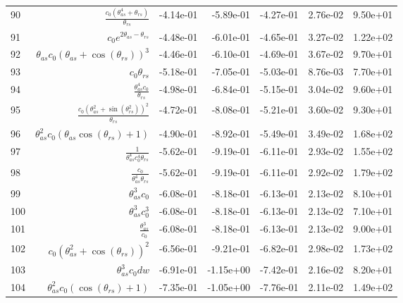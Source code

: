 \begin{tabularx}{\textwidth}{lRRRRRl}
90  &  $ \displaystyle\frac{c_{0} \left(\theta_{as}^{4} + \theta_{rs}\right)}{\theta_{rs}} $  &  -4.14e-01  &  -5.89e-01  &  -4.27e-01  &  2.76e-02  &  9.50e+01  \\ 
91  &  $ c_{0} e^{2 \theta_{as} - \theta_{rs}} $  &  -4.48e-01  &  -6.01e-01  &  -4.65e-01  &  3.27e-02  &  1.22e+02  \\ 
92  &  $ \theta_{as} c_{0} \left(\theta_{as} + \cos{\left(\theta_{rs} \right)}\right)^{3} $  &  -4.46e-01  &  -6.10e-01  &  -4.69e-01  &  3.67e-02  &  9.70e+01  \\ 
93  &  $ c_{0} \theta_{rs} $  &  -5.18e-01  &  -7.05e-01  &  -5.03e-01  &  8.76e-03  &  7.70e+01  \\ 
94  &  $ \displaystyle\frac{\theta_{as}^{4} c_{0}}{\theta_{rs}} $  &  -4.98e-01  &  -6.84e-01  &  -5.15e-01  &  3.04e-02  &  9.60e+01  \\ 
95  &  $ \displaystyle\frac{c_{0} \left(\theta_{as}^{2} + \sin{\left(\theta_{rs}^{2} \right)}\right)^{2}}{\theta_{rs}} $  &  -4.72e-01  &  -8.08e-01  &  -5.21e-01  &  3.60e-02  &  9.30e+01  \\ 
96  &  $ \theta_{as}^{2} c_{0} \left(\theta_{as} \cos{\left(\theta_{rs} \right)} + 1\right) $  &  -4.90e-01  &  -8.92e-01  &  -5.49e-01  &  3.49e-02  &  1.68e+02  \\ 
97  &  $ \displaystyle\frac{1}{\theta_{as}^{4} c_{0}^{4} \theta_{rs}} $  &  -5.62e-01  &  -9.19e-01  &  -6.11e-01  &  2.93e-02  &  1.55e+02  \\ 
98  &  $ \displaystyle\frac{c_{0}}{\theta_{as}^{4} \theta_{rs}} $  &  -5.62e-01  &  -9.19e-01  &  -6.11e-01  &  2.92e-02  &  1.79e+02  \\ 
99  &  $ \theta_{as}^{3} c_{0} $  &  -6.08e-01  &  -8.18e-01  &  -6.13e-01  &  2.13e-02  &  8.10e+01  \\ 
100  &  $ \theta_{as}^{3} c_{0}^{3} $  &  -6.08e-01  &  -8.18e-01  &  -6.13e-01  &  2.13e-02  &  7.10e+01  \\ 
101  &  $ \displaystyle\frac{\theta_{as}^{3}}{c_{0}} $  &  -6.08e-01  &  -8.18e-01  &  -6.13e-01  &  2.13e-02  &  9.00e+01  \\ 
102  &  $ c_{0} \left(\theta_{as}^{2} + \cos{\left(\theta_{rs} \right)}\right)^{2} $  &  -6.56e-01  &  -9.21e-01  &  -6.82e-01  &  2.98e-02  &  1.73e+02  \\ 
103  &  $ \theta_{as}^{3} c_{0} d w $  &  -6.91e-01  &  -1.15e+00  &  -7.42e-01  &  2.16e-02  &  8.20e+01  \\ 
104  &  $ \theta_{as}^{2} c_{0} \left(\cos{\left(\theta_{rs} \right)} + 1\right) $  &  -7.35e-01  &  -1.05e+00  &  -7.76e-01  &  2.11e-02  &  1.49e+02  \\ 

\end{tabularx}
